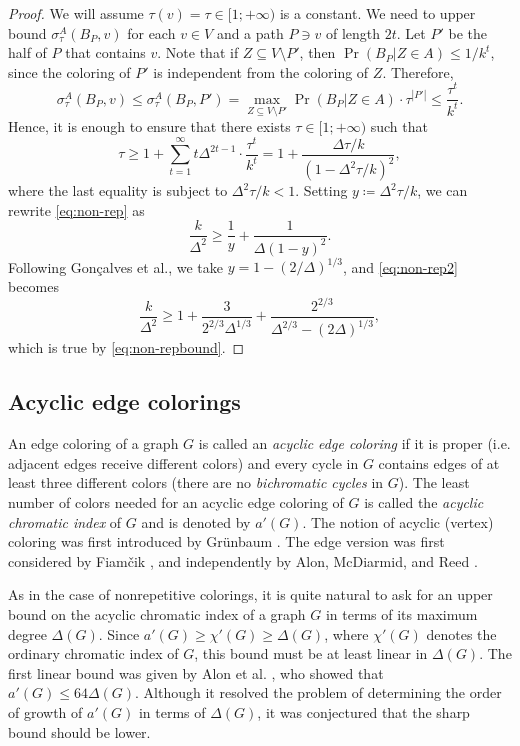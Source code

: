 \documentclass[10pt]{article}
\numberwithin{equation}{subsection}
\theoremstyle{definition}
\begin{document}
\begin{proof}
		We will assume $\tau(v) = \tau \in [1;+\infty)$ is a constant. We need to upper bound $\sigma^A_\tau(B_P, v)$ for each $v \in V$ and a path $P \ni v$ of length $2t$. Let $P'$ be the half of $P$ that contains $v$. Note that if $Z \subseteq V \setminus P'$, then $ \Pr(B_P \vert Z \in A) \leq  1/k^t$, since the coloring of $P'$ is independent from the coloring of $Z$. Therefore,
		$$
			\sigma^A_\tau(B_P, v) \leq \sigma^A_\tau(B_P, P') = \max_{Z \subseteq V \setminus P'} \Pr(B_P \vert Z \in A) \cdot \tau^{|P'|} \leq \frac{\tau^t}{k^t}.
		$$
		Hence, it is enough to ensure that there exists $\tau \in [1;+\infty)$ such that
		\begin{equation}\label{eq:non-rep}
			\tau \geq 1 + \sum_{t = 1}^\infty t\Delta^{2t-1} \cdot \frac{\tau^t}{k^t} = 1 + \frac{\Delta \tau/k}{(1-\Delta^2 \tau/k)^2},
		\end{equation}
		where the last equality is subject to $\Delta^2 \tau/k < 1$. Setting $y \coloneqq \Delta^2 \tau/k$, we can rewrite \eqref{eq:non-rep} as
		\begin{equation}\label{eq:non-rep2}
			\frac{k}{\Delta^2} \geq \frac{1}{y} + \frac{1}{\Delta(1-y)^2}.
		\end{equation}
		Following Gon\c{c}alves et al., we take $y = 1 - \left(2/\Delta\right)^{1/3}$, and \eqref{eq:non-rep2} becomes
		$$
			\frac{k}{\Delta^2} \geq 1+ \frac{3}{2^{2/3}\Delta^{1/3}} +\frac{2^{2/3}}{\Delta^{2/3}-(2\Delta)^{1/3}}, 
		$$
		which is true by \eqref{eq:non-repbound}.
	\end{proof}
	
	\subsection{Acyclic edge colorings}\label{subsec:acyclic}
	
	An edge coloring of a graph $G$ is called an \emph{acyclic edge coloring} if it is proper (i.e. adjacent edges receive different colors) and every cycle in $G$ contains edges of at least three different colors (there are no \emph{bichromatic cycles} in $G$). The least number of colors needed for an acyclic edge coloring of $G$ is called the \emph{acyclic chromatic index} of $G$ and is denoted by $a'(G)$. The notion of acyclic (vertex) coloring was first introduced by Gr\"{u}nbaum \cite{Grunbaum}. The edge version was first considered by Fiam\v{c}ik \cite{Fiamcik}, and independently by Alon, McDiarmid, and Reed \cite{Alon1}.
	
	As in the case of nonrepetitive colorings, it is quite natural to ask for an upper bound on the acyclic chromatic index of a graph $G$ in terms of its maximum degree $\Delta(G)$. Since $a'(G)\geq \chi'(G) \geq \Delta(G)$, where $\chi'(G)$ denotes the ordinary chromatic index of $G$, this bound must be at least linear in $\Delta(G)$. The first linear bound was given by Alon et al. \cite{Alon1}, who showed that $a'(G)\leq 64 \Delta(G)$. Although it resolved the problem of determining the order of growth of $a'(G)$ in terms of $\Delta(G)$, it was conjectured that the sharp bound should be lower.
	
\end{document}
